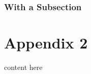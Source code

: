\documentclass[hidelinks,11pt,a4paper,oneside,article]{memoir}
\numberwithin{equation}{chapter}
\begin{document}

\subsection{With a Subsection}

\clearpage %



\chapter{Appendix 2}\label{appx:second}

content here 

\clearpage
{}
\end{document}
